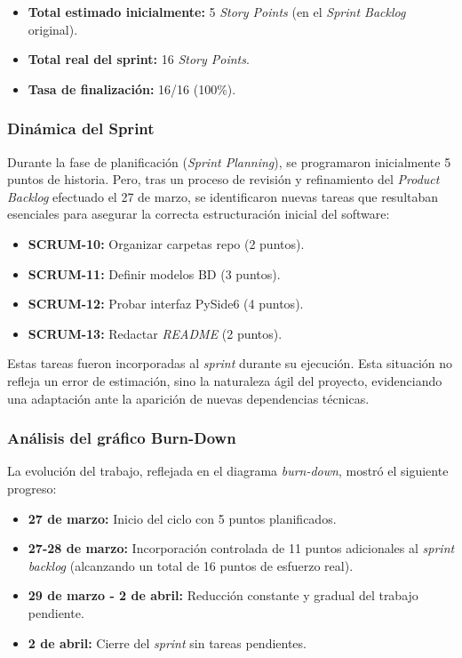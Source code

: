 \begin{itemize}
    \item \textbf{Total estimado inicialmente:} 5 \textit{Story Points} (en el \textit{Sprint Backlog} original).
    \item \textbf{Total real del sprint:} 16 \textit{Story Points}.
    \item \textbf{Tasa de finalización:} 16/16 (100\%).
\end{itemize}

\subsubsection{Dinámica del Sprint}
Durante la fase de planificación (\textit{Sprint Planning}), se programaron inicialmente 5 puntos de historia. Pero, tras un proceso de revisión y refinamiento del \textit{Product Backlog} efectuado el 27 de marzo, se identificaron nuevas tareas que resultaban esenciales para asegurar la correcta estructuración inicial del software:

\begin{itemize}
    \item \textbf{SCRUM-10:} Organizar carpetas repo (2 puntos).
    \item \textbf{SCRUM-11:} Definir modelos BD (3 puntos).
    \item \textbf{SCRUM-12:} Probar interfaz PySide6 (4 puntos).
    \item \textbf{SCRUM-13:} Redactar  \textit{README} (2 puntos).
\end{itemize}

Estas tareas fueron incorporadas al \textit{sprint} durante su ejecución. Esta situación no refleja un error de estimación, sino la naturaleza ágil del proyecto, evidenciando una adaptación ante la aparición de nuevas dependencias técnicas.

\subsubsection{Análisis del gráfico Burn-Down}

La evolución del trabajo, reflejada en el diagrama \textit{burn-down}, mostró el siguiente progreso:

\begin{itemize}
    \item \textbf{27 de marzo:} Inicio del ciclo con 5 puntos planificados.
    \item \textbf{27-28 de marzo:} Incorporación controlada de 11 puntos adicionales al \textit{sprint backlog} (alcanzando un total de 16 puntos de esfuerzo real).
    \item \textbf{29 de marzo - 2 de abril:} Reducción constante y gradual del trabajo pendiente.
    \item \textbf{2 de abril:} Cierre del \textit{sprint} sin tareas pendientes.
\end{itemize}

